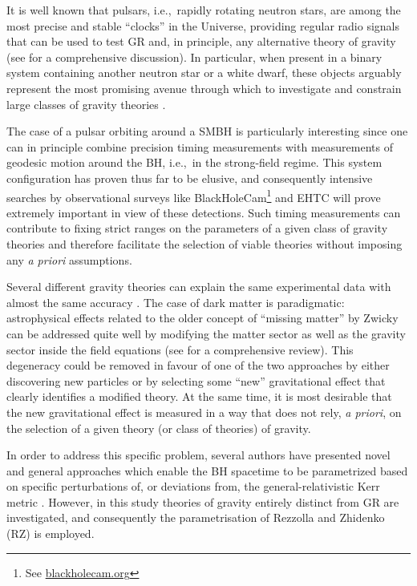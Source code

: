 \documentclass[a4paper,aps,twocolumn,showpacs,showkeys,nofootinbib,preprintnumbers,superscriptaddress,amsmath,amssymb,amsfonts]{revtex4-1}
\newcommand{\ie}{{i.e.,}~}
\begin{document}
It is well known that pulsars, \ie rapidly rotating neutron stars, 
are among the most precise and stable
``clocks'' in the Universe, providing regular radio signals that can be
used to test GR and, in principle, any
alternative theory of gravity (see \cite{Lorimer2012} for a comprehensive
discussion).
In particular, when present in a binary system containing
another neutron star or a white dwarf, these objects arguably represent the
most promising avenue through which to investigate and constrain
large classes of gravity theories \cite{Freire2012}. 

The case of a pulsar orbiting around a SMBH is particularly interesting
since one can in principle combine precision timing measurements
with measurements of geodesic motion around the BH, \ie in the
strong-field regime. 
This system configuration has proven thus far to be elusive,
and consequently intensive searches by observational surveys like
BlackHoleCam\footnote{See
\href{https://blackholecam.org}{blackholecam.org}} and EHTC
will prove extremely important in view of these detections.
Such timing measurements can contribute to fixing strict
ranges on the parameters of a given class of gravity theories 
and therefore facilitate the selection of viable theories without
imposing any {\it a priori} assumptions.

Several different gravity theories can explain the
same experimental data with almost the same accuracy \cite{Planck2016a,BICEP2014}. 
The case of dark
matter is paradigmatic: astrophysical effects related to the older
concept of ``{missing matter}'' by Zwicky \cite{Zwicky1933} can be
addressed quite well by modifying the matter sector as well as the
gravity sector inside the field equations (see \cite{Capozziello2012} for a
comprehensive review). This degeneracy could be removed in favour of one
of the two approaches by either discovering new particles or by selecting
some ``new'' gravitational effect that clearly identifies a modified
theory.  At the same time, it is most desirable that the new
gravitational effect is measured in a way
that does not rely, {\it a priori}, on the selection of a given theory (or class
of theories) of gravity.

In order to address this specific problem, several authors have presented
novel and general approaches which enable the BH spacetime to
be parametrized based on
specific perturbations of, or deviations from, the general-relativistic Kerr metric
\cite{Johannsen2011,LinBambi2015}.
However, in this study theories of gravity entirely distinct from
GR are investigated, and consequently the parametrisation of Rezzolla and Zhidenko (RZ)
\cite{Rezzolla2014} is employed.
\end{document}
